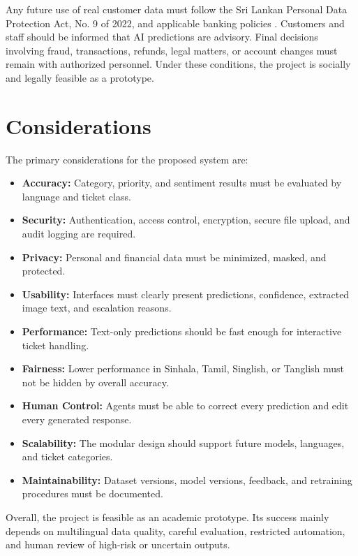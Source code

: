 \documentclass[11pt,a4paper]{article}
\begin{document}
Any future use of real customer data must follow the Sri Lankan Personal Data Protection Act, No. 9 of 2022, and applicable banking policies \cite{pdpa}. Customers and staff should be informed that AI predictions are advisory. Final decisions involving fraud, transactions, refunds, legal matters, or account changes must remain with authorized personnel. Under these conditions, the project is socially and legally feasible as a prototype.

\section{Considerations}

The primary considerations for the proposed system are:

\begin{itemize}
    \item \textbf{Accuracy:} Category, priority, and sentiment results must be evaluated by language and ticket class.
    \item \textbf{Security:} Authentication, access control, encryption, secure file upload, and audit logging are required.
    \item \textbf{Privacy:} Personal and financial data must be minimized, masked, and protected.
    \item \textbf{Usability:} Interfaces must clearly present predictions, confidence, extracted image text, and escalation reasons.
    \item \textbf{Performance:} Text-only predictions should be fast enough for interactive ticket handling.
    \item \textbf{Fairness:} Lower performance in Sinhala, Tamil, Singlish, or  Tanglish must not be hidden by overall accuracy.
    \item \textbf{Human Control:} Agents must be able to correct every prediction and edit every generated response.
    \item \textbf{Scalability:} The modular design should support future models, languages, and ticket categories.
    \item \textbf{Maintainability:} Dataset versions, model versions, feedback, and retraining procedures must be documented.
\end{itemize}

Overall, the project is feasible as an academic prototype. Its success mainly depends on multilingual data quality, careful evaluation, restricted automation, and human review of high-risk or uncertain outputs.
\end{document}
